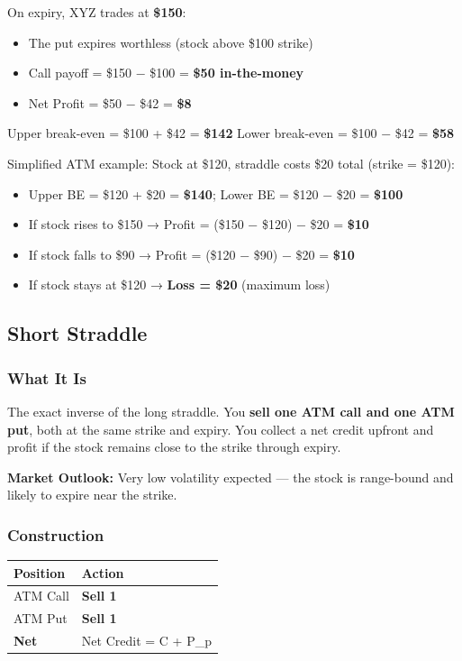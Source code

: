 \documentclass[12pt,openany]{book}
\begin{document}
On expiry, XYZ trades at \textbf{\$150}:
\begin{itemize}[leftmargin=*]
    \item The put expires worthless (stock above \$100 strike)
    \item Call payoff = \$150 − \$100 = \textbf{\$50 in-the-money}
    \item Net Profit = \$50 − \$42 = \textbf{\$8}
\end{itemize}

Upper break-even = \$100 + \$42 = \textbf{\$142}
Lower break-even = \$100 − \$42 = \textbf{\$58}

Simplified ATM example: Stock at \$120, straddle costs \$20 total (strike = \$120):
\begin{itemize}[leftmargin=*]
    \item Upper BE = \$120 + \$20 = \textbf{\$140}; Lower BE = \$120 − \$20 = \textbf{\$100}
    \item If stock rises to \$150 → Profit = (\$150 − \$120) − \$20 = \textbf{\$10}
    \item If stock falls to \$90 → Profit = (\$120 − \$90) − \$20 = \textbf{\$10}
    \item If stock stays at \$120 → \textbf{Loss = \$20} (maximum loss)
\end{itemize}



\subsection{Short Straddle}

\subsubsection{What It Is}

The exact inverse of the long straddle. You \textbf{sell one ATM call and one ATM put}, both at the same strike and expiry. You collect a net credit upfront and profit if the stock remains close to the strike through expiry.

\textbf{Market Outlook:} Very low volatility expected — the stock is range-bound and likely to expire near the strike.



\subsubsection{Construction}

\begin{center}
\scriptsize
\setlength{\tabcolsep}{3pt}
\begin{tabular}{|L{6.00cm}|L{6.00cm}|}
\hline
Position & Action \\
\hline
ATM Call & \textbf{Sell 1} \\
\hline
ATM Put & \textbf{Sell 1} \\
\hline
\textbf{Net} & Net Credit = C + P\_p \\
\hline
\end{tabular}
\end{center}
\end{document}
